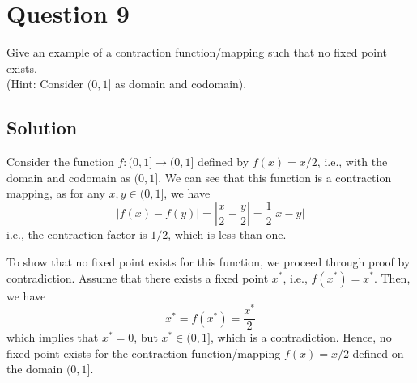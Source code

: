 \section*{Question 9}\label{sec:q9}

Give an example of a contraction function/mapping such that no fixed point exists. \\
(Hint: Consider \( (0,1] \) as domain and codomain).

\subsection*{Solution}

Consider the function \( f: (0,1] \to (0,1] \) defined by \( f(x) = x/2 \), i.e., with the domain and codomain as \( (0,1] \).
We can see that this function is a contraction mapping, as for any \( x, y \in (0,1] \), we have
\[
    \vert f(x) - f(y) \vert = \left\vert \frac{x}{2} - \frac{y}{2} \right\vert = \frac{1}{2} \vert x - y \vert
\]
i.e., the contraction factor is \( 1/2 \), which is less than one.

To show that no fixed point exists for this function, we proceed through proof by contradiction.
Assume that there exists a fixed point \( x^* \), i.e., \( f(x^*) = x^* \).
Then, we have
\[
    x^* = f(x^*) = \frac{x^*}{2}
\]
which implies that \( x^* = 0 \), but \( x^* \in (0,1] \), which is a contradiction.
Hence, no fixed point exists for the contraction function/mapping \( f(x) = x/2 \) defined on the domain \( (0,1] \).
